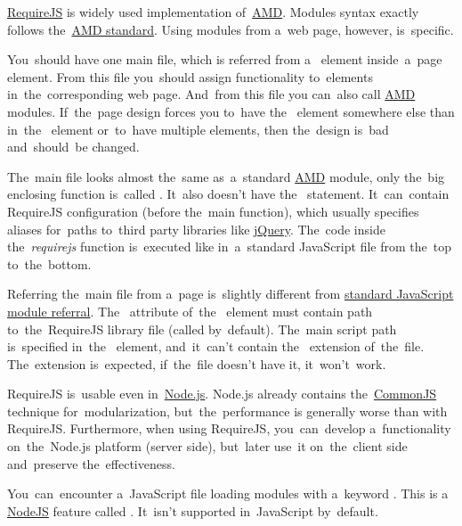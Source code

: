 \label{requirejs}
\href{https://requirejs.org}{RequireJS} is widely used implementation of~\hyperref[amd]{AMD}.
Modules syntax exactly follows the~\hyperref[amdsyntax]{AMD standard}.
Using modules from a~web page, however, is~specific.

You~should have one main file, which is referred from a~ element inside~a~page  element.
From this file you~should assign functionality to~elements in~the~corresponding web page.
And~from this file you can~also call \hyperref[amd]{AMD} modules.
If~the~page design forces you to~have the~ element somewhere else than in~the~ element or~to~have multiple  elements, then the~design is~bad and~should~be changed.

The~main file looks almost the~same as~a~standard \hyperref[amd]{AMD} module, only the~big enclosing function is~called .
It~also doesn't have the~ statement.
It~can~contain RequireJS configuration (before the~main  function), which usually specifies aliases for~paths to~third party libraries like \hyperref[jquery]{jQuery}.
The~code inside \mbox{the \textit{requirejs}} function is~executed like in~a~standard JavaScript file from the~top to~the~bottom.

Referring the~main file from a~page is~slightly different from \hyperref[javascriptmodularity]{standard JavaScript module referral}.
The~ attribute of~the~ element must contain path to~the~RequireJS library file (called  by~default).
The~main script path is~specified in~the~ element, and~it~can't contain the~ extension of~the~file.
The~extension is~expected, if~the~file doesn't have it, it~won't~work.

\note RequireJS is~usable even in~\hyperref[nodejs]{Node.js}.
Node.js already contains \mbox{the \hyperref[nodejscommonjs]{CommonJS}} technique for~modularization, but~the~performance is generally worse than with RequireJS\@.
Furthermore, when using RequireJS, you~can~develop a~functionality on~the~Node.js platform (server side), but~later use~it on~the~client side and~preserve the~effectiveness.

\warning You~can~encounter a~JavaScript file loading modules with a~keyword .
This is a \hyperref[nodejs]{NodeJS} feature called \hyperref[nodejscommonjs]{}.
It~isn't supported in~JavaScript by~default.

